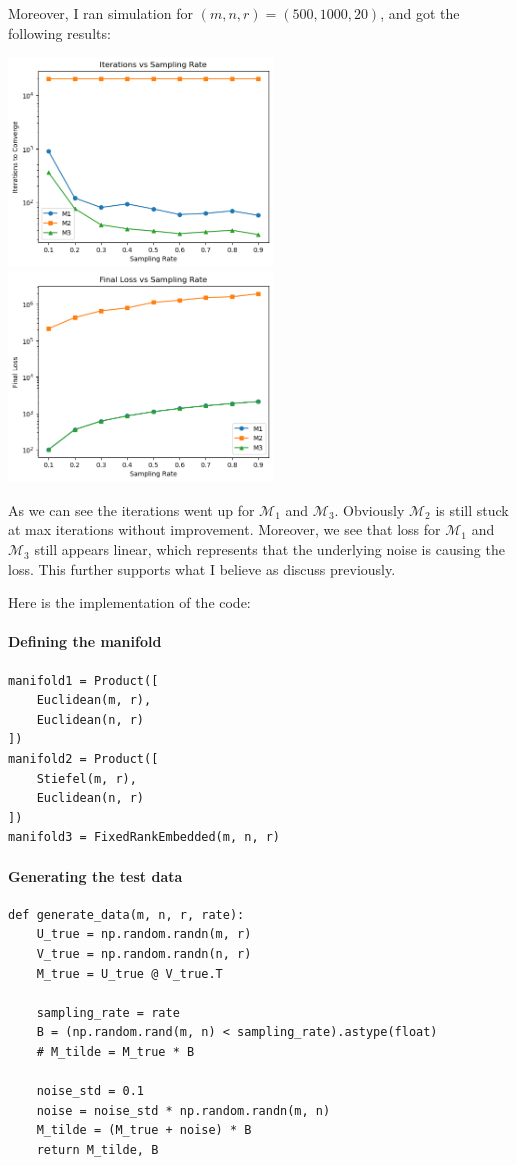 \documentclass[11pt]{scrartcl}
\begin{document}
Moreover, I ran simulation for $(m, n, r) = (500, 1000, 20)$, and got the following results: \begin{center}
    \includegraphics[width=7cm]{hw3-img/hw3-p4-3.png}
    \includegraphics[width=7cm]{hw3-img/hw3-p4-4.png}
\end{center}
As we can see the iterations went up for $\mathcal M_1$ and $\mathcal M_3$. Obviously $\mathcal M_2$ is still stuck at max iterations without improvement. Moreover, we see that loss for $\mathcal M_1$ and $\mathcal M_3$ still appears linear, which represents that the underlying noise is causing the loss. This further supports what I believe as discuss previously.

Here is the implementation of the code:
\paragraph{Defining the manifold}
\begin{verbatim}
manifold1 = Product([
    Euclidean(m, r),
    Euclidean(n, r)
])
manifold2 = Product([
    Stiefel(m, r),
    Euclidean(n, r)
])
manifold3 = FixedRankEmbedded(m, n, r)
\end{verbatim}

\paragraph{Generating the test data}
\begin{verbatim}
def generate_data(m, n, r, rate):
    U_true = np.random.randn(m, r)
    V_true = np.random.randn(n, r)
    M_true = U_true @ V_true.T

    sampling_rate = rate
    B = (np.random.rand(m, n) < sampling_rate).astype(float)
    # M_tilde = M_true * B

    noise_std = 0.1
    noise = noise_std * np.random.randn(m, n)
    M_tilde = (M_true + noise) * B
    return M_tilde, B
\end{verbatim}
\end{document}
